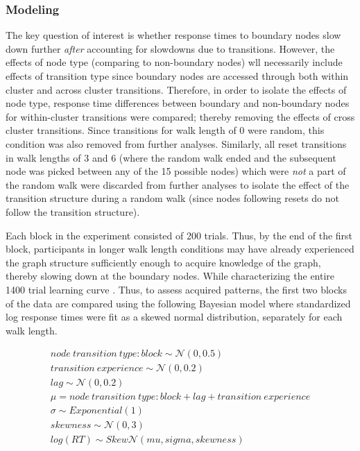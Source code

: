 \subsubsection*{Modeling}
The key question of interest is whether response times to boundary nodes slow down further \textit{after} accounting for slowdowns due to transitions. However, the effects of node type (comparing to non-boundary nodes) wll necessarily include effects of transition type since boundary nodes are accessed through both within cluster and across cluster transitions. Therefore, in order to isolate the effects of node type, response time differences between boundary and non-boundary nodes for within-cluster transitions were compared; thereby removing the effects of cross cluster transitions. Since transitions for walk length of 0 were random, this condition was also removed from further analyses. Similarly, all reset transitions in walk lengths of 3 and 6 \ac{(where the random walk ended and the subsequent node was picked between any of the 15 possible nodes)} which were \textit{not} a part of the random walk were discarded from further analyses \ac{to isolate the effect of the transition structure during a random walk (since nodes following resets do not follow the transition structure)}. 

Each block in the experiment consisted of 200 trials. Thus, by the end of the first block, participants in longer walk length conditions may have already experienced the graph structure sufficiently enough to acquire knowledge of the graph, thereby slowing down at the boundary nodes. While characterizing the entire 1400 trial learning curve . Thus, to assess acquired patterns, the first two blocks of the data are compared using the following Bayesian model where standardized log response times were fit as a skewed normal distribution, separately for each walk length.

\begin{equation}
	\begin{aligned}
		node\ transition\ type : block \sim \mathcal{N}(0, 0.5) \\ 
		transition\ experience \sim \mathcal{N}(0, 0.2) \\  
		lag \sim \mathcal{N}(0, 0.2) \\ 
		\mu = node\ transition\ type : block + lag + transition\ experience \\
		\sigma \sim Exponential(1) \\ 
		skewness \sim \mathcal{N}(0, 3) \\ 
		log(RT) \sim Skew\mathcal{N}(mu, sigma, skewness)
	\end{aligned}
\end{equation} 

